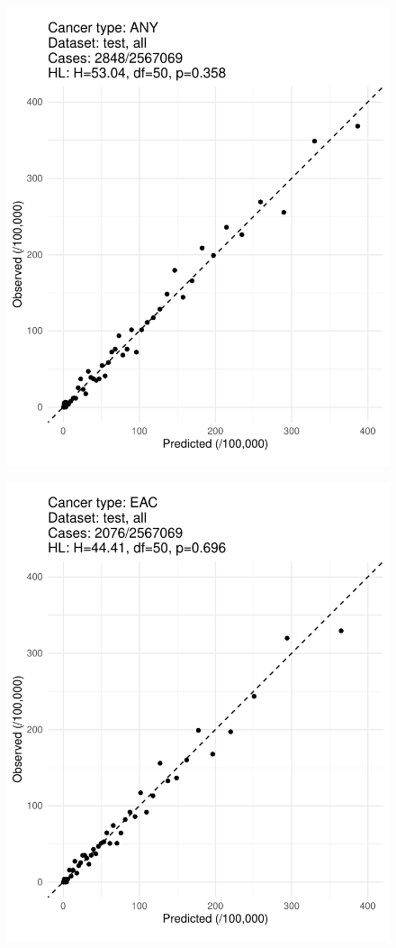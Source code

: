 \documentclass[english]{article}
\begin{document}
\begin{figure}[ht]
\includegraphics[width=0.9\linewidth]{calibration/ANY_all.pdf}
\end{figure}
\begin{figure}[ht]
\includegraphics[width=0.9\linewidth]{calibration/EAC_all.pdf}
\end{figure}
\end{document}
